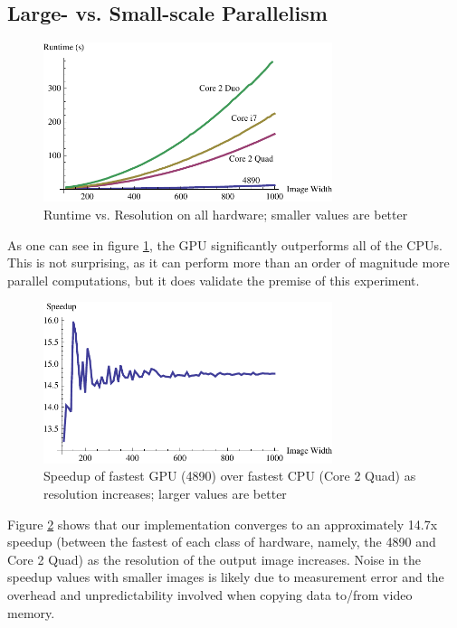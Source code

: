 \documentclass{acmsiggraph}
\begin{document}
\subsection{Large- vs. Small-scale Parallelism}

\begin{figure}
    \includegraphics[width=84.5mm]{runtimePlot.pdf}
    \caption{Runtime vs. Resolution on all hardware; smaller values are better}
    \label{fig:runtimePlot}
\end{figure}

As one can see in figure \ref{fig:runtimePlot}, the GPU significantly outperforms all of the CPUs. This is not surprising, as it can perform more than an order of magnitude more parallel computations, but it does validate the premise of this experiment.

\begin{figure}
    \includegraphics[width=84.5mm]{speedupPlot.pdf}
    \caption{Speedup of fastest GPU (4890) over fastest CPU (Core 2 Quad) as resolution increases; larger values are better}
    \label{fig:speedupPlot}
\end{figure}

Figure \ref{fig:speedupPlot} shows that our implementation converges to an approximately 14.7x speedup (between the fastest of each class of hardware, namely, the 4890 and Core 2 Quad) as the resolution of the output image increases. Noise in the speedup values with smaller images is likely due to measurement error and the overhead and unpredictability involved when copying data to/from video memory.
\end{document}
